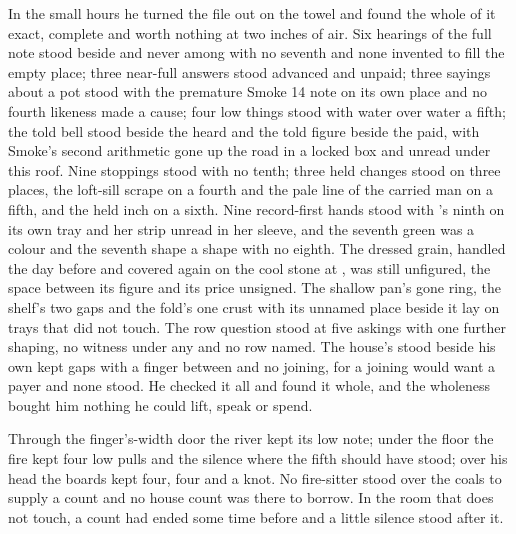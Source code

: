 In the small hours he turned the file out on the towel and found the whole of it exact, complete and worth nothing at two inches of air. Six hearings of the full note stood beside and never among with no seventh and none invented to fill the empty place; three near-full answers stood advanced and unpaid; three sayings about a pot stood with the premature Smoke 14 note on its own place and no fourth likeness made a cause; four low things stood with water over water a fifth; the told bell stood beside the heard and the told figure beside the paid, with Smoke's second arithmetic gone up the road in a locked box and unread under this roof. Nine stoppings stood with no tenth; three held changes stood on three places, the loft-sill scrape on a fourth and the pale line of the carried man on a fifth, and the held inch on a sixth. Nine record-first hands stood with 's ninth on its own tray and her strip unread in her sleeve, and the seventh green was a colour and the seventh shape a shape with no eighth. The dressed grain, handled the day before and covered again on the cool stone at , was still unfigured, the space between its figure and its price unsigned. The shallow pan's gone ring, the shelf's two gaps and the fold's one crust with its unnamed place beside it lay on trays that did not touch. The row question stood at five askings with one further shaping, no witness under any and no row named. The house's  stood beside his own kept gaps with a finger between and no joining, for a joining would want a payer and none stood. He checked it all and found it whole, and the wholeness bought him nothing he could lift, speak or spend.

Through the finger's-width door the river kept its low note; under the floor the fire kept four low pulls and the silence where the fifth should have stood; over his head the boards kept four, four and a knot. No fire-sitter stood over the coals to supply a count and no house count was there to borrow. In the room that does not touch, a count had ended some time before and a little silence stood after it.


